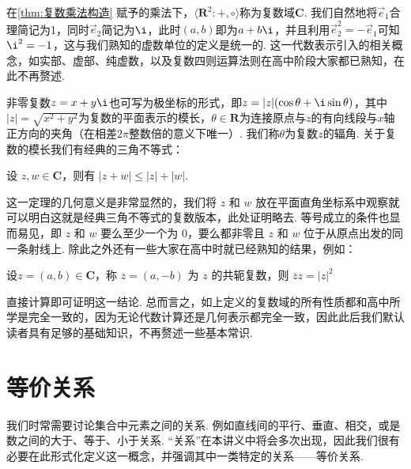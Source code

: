 在\autoref{thm:复数乘法构造} 赋予的乘法下，$\langle\mathbf{R}^2\colon+,\circ\rangle$称为复数域$\mathbf{C}$. 我们自然地将$\vec{e}_1$合理简记为1，同时$\vec{e}_2$简记为$\i$，此时$(a,b)$即为$a+b\i$，并且利用$\vec{e}_2^2=-\vec{e}_1$可知$\i^2=-1$，这与我们熟知的虚数单位的定义是统一的. 这一代数表示引入的相关概念，如实部、虚部、纯虚数，以及复数四则运算法则在高中阶段大家都已熟知，在此不再赘述.

非零复数$z=x+y\i$也可写为极坐标的形式，即$z=|z|(\cos\theta+\i\sin\theta)$，其中$|z|=\sqrt{x^2+y^2}$为复数的平面表示的模长，$\theta\in\mathbf{R}$为连接原点与$z$的有向线段与$x$轴正方向的夹角（在相差$2\pi$整数倍的意义下唯一）. 我们称$\theta$为复数$z$的辐角. 关于复数的模长我们有经典的三角不等式：

\begin{theorem}{}{}
    设 $z, w \in \mathbf{C}$，则有 $|z + w| \leqslant |z| + |w|$.
\end{theorem}

这一定理的几何意义是非常显然的，我们将 $z$ 和 $w$ 放在平面直角坐标系中观察就可以明白这就是经典三角不等式的复数版本，此处证明略去. 等号成立的条件也显而易见，即 $z$ 和 $w$ 要么至少一个为 $0$，要么都非零且 $z$ 和 $w$ 位于从原点出发的同一条射线上. 除此之外还有一些大家在高中时就已经熟知的结果，例如：

\begin{theorem}{}{}
    设$z = (a, b) \in \mathbf{C}$，称 $\overline{z} = (a, -b)$ 为 $z$ 的共轭复数，则 $\overline{z} z = |z|^2$
\end{theorem}

直接计算即可证明这一结论. 总而言之，如上定义的复数域的所有性质都和高中所学是完全一致的，因为无论代数计算还是几何表示都完全一致，因此此后我们默认读者具有足够的基础知识，不再赘述一些基本常识.

\section{等价关系}

我们时常需要讨论集合中元素之间的关系. 例如直线间的平行、垂直、相交，或是数之间的大于、等于、小于关系. ``关系''在本讲义中将会多次出现，因此我们很有必要在此形式化定义这一概念，并强调其中一类特定的关系——等价关系.

